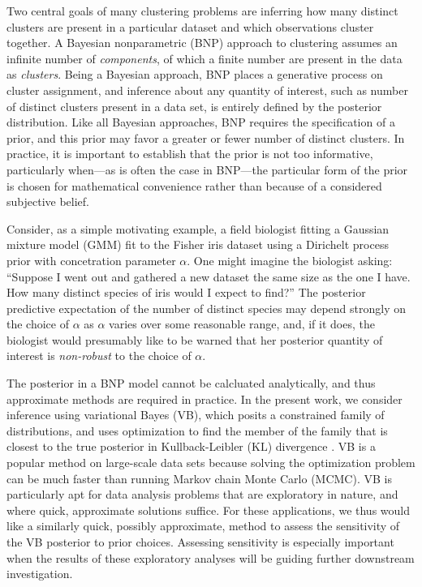 Two central goals of many clustering problems are inferring how many distinct
clusters are present in a particular dataset and which observations cluster
together. A Bayesian nonparametric (BNP) approach to clustering assumes an
infinite number of \textit{components}, of which a finite number are present in
the data as \textit{clusters}. Being a Bayesian approach, BNP places a
generative process on cluster assignment, and inference about any quantity of
interest, such as number of distinct clusters present in a data set, is entirely
defined by the posterior distribution. Like all Bayesian approaches, BNP
requires the specification of a prior, and this prior may favor a greater or
fewer number of distinct clusters. In practice, it is important to establish
that the prior is not too informative, particularly when---as is often the case
in BNP---the particular form of the prior is chosen for mathematical convenience
rather than because of a considered subjective belief.

Consider, as a simple motivating example, a field biologist fitting a Gaussian
mixture model (GMM) fit to the Fisher iris dataset \citep{anderson:1936:iris,
fisher:1936:iris} using a Dirichelt process prior with concetration parameter
$\alpha$.  One might imagine the biologist asking: ``Suppose I went out and
gathered a new dataset the same size as the one I have.  How many distinct
species of iris would I expect to find?''  The posterior predictive expectation
of the number of distinct species may depend strongly on the choice of $\alpha$
as $\alpha$ varies over some reasonable range, and, if it does, the biologist
would presumably like to be warned that her posterior quantity of interest is
{\em non-robust} to the choice of $\alpha$.

The posterior in a BNP model cannot be calcluated analytically, and thus
approximate methods are required in practice. In the present work, we consider
inference using variational Bayes (VB), which posits a constrained family of
distributions, and uses optimization to find the member of the family that is
closest to the true posterior in Kullback-Leibler ($\mathrm{KL}$) divergence
\citep{jordan:1999:vi, wainwright:2008:graphical_models, blei:2017:vi_review}.
VB is a popular method on large-scale data sets because solving the optimization
problem can be much faster than running Markov chain Monte Carlo (MCMC). VB is
particularly apt for data analysis problems that are exploratory in nature, and
where quick, approximate solutions suffice. For these applications, we thus
would like a similarly quick, possibly approximate, method to assess the
sensitivity of the VB posterior to prior choices. Assessing sensitivity is
especially important when the results of these exploratory analyses will be
guiding further downstream investigation.

